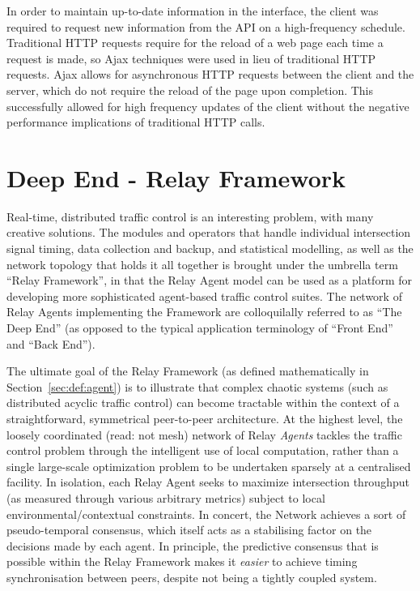 \documentclass{report}
\begin{document}
In order to maintain up-to-date information in the interface, the client was required to request new information from the API on a high-frequency schedule. Traditional HTTP requests require for the reload of a web page each time a request is made, so Ajax techniques were used in lieu of traditional HTTP requests. Ajax allows for asynchronous HTTP requests between the client and the server, which do not require the reload of the page upon completion. This successfully allowed for high frequency updates of the client without the negative performance implications of traditional HTTP calls.

\section{Deep End - Relay Framework}
\label{sec:deep_end}

Real-time, distributed traffic control is an interesting problem, with many creative solutions.
The modules and operators that handle individual intersection signal timing, data collection and backup, and statistical modelling, as well as the network topology that holds it all together is brought under the umbrella term ``Relay Framework'', in that the Relay Agent model can be used as a platform for developing more sophisticated agent-based traffic control suites.
The network of Relay Agents implementing the Framework are colloquilally referred to as ``The Deep End'' (as opposed to the typical application terminology of ``Front End'' and ``Back End'').

The ultimate goal of the Relay Framework (as defined mathematically in Section~\ref{sec:def:agent}) is to illustrate that complex chaotic systems (such as distributed acyclic traffic control) can become tractable within the context of a straightforward, symmetrical peer-to-peer architecture.
At the highest level, the loosely coordinated (read: not mesh) network of Relay \emph{Agents} tackles the traffic control problem through the intelligent use of local computation, rather than a single large-scale optimization problem to be undertaken sparsely at a centralised facility.
In isolation, each Relay Agent seeks to maximize intersection throughput (as measured through various arbitrary metrics) subject to local environmental/contextual constraints.
In concert, the Network achieves a sort of pseudo-temporal consensus, which itself acts as a stabilising factor on the decisions made by each agent.
In principle, the predictive consensus that is possible within the Relay Framework makes it \emph{easier} to achieve timing synchronisation between peers, despite not being a tightly coupled system.
\end{document}
